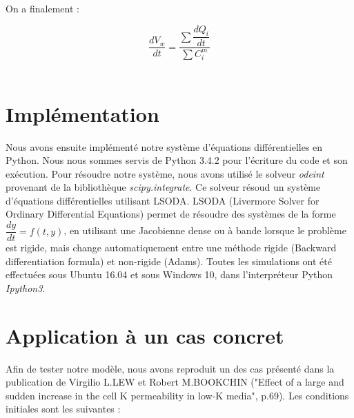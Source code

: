 \documentclass[a4paper,fleqn]{article}
\begin{document}
On a finalement :

\begin{equation*}
\dfrac{dV_w}{dt}=\dfrac{\sum \dfrac{dQ_i}{dt}}{\sum C_{i}^m}
\end{equation*}\\


\section{Implémentation}   

Nous avons ensuite implémenté notre système d'équations différentielles en Python. Nous nous sommes servis de Python 3.4.2 pour l'écriture du code et son exécution. Pour résoudre notre système, nous avons utilisé le solveur \textit{odeint} provenant de la bibliothèque \textit{scipy.integrate}. Ce solveur résoud un système d'équations différentielles utilisant LSODA. LSODA (Livermore Solver for Ordinary Differential Equations) permet de résoudre des systèmes de la forme $\dfrac{dy}{dt}=f\left(t,y\right)$, en utilisant une Jacobienne dense ou à bande lorsque le problème est rigide, mais change automatiquement entre une méthode rigide (Backward differentiation formula) et non-rigide (Adams).
Toutes les simulations ont été effectuées sous Ubuntu 16.04 et sous Windows 10, dans l'interpréteur Python \textit{Ipython3}.
   



\section{Application à un cas concret}

Afin de tester notre modèle, nous avons reproduit un des cas présenté dans la publication de Virgilio L.LEW et Robert M.BOOKCHIN ("Effect of a large and sudden increase in the cell K permeability in low-K media", p.69). Les conditions initiales sont les suivantes :\\
\end{document}
